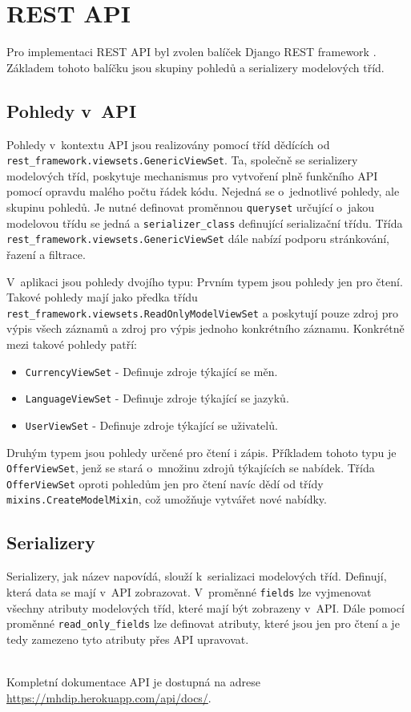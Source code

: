 \section{REST API}
Pro implementaci REST API byl zvolen balíček Django REST framework \cite{django-rest-framework}. Základem tohoto balíčku jsou skupiny pohledů a serializery modelových tříd.

\subsection{Pohledy v~API}
\begin{sloppypar}
Pohledy v~kontextu API jsou realizovány pomocí tříd dědících od \texttt{rest\_framework.viewsets.GenericViewSet}. Ta, společně se serializery modelových tříd, poskytuje mechanismus pro vytvoření plně funkčního API pomocí opravdu malého počtu řádek kódu. Nejedná se o~jednotlivé pohledy, ale skupinu pohledů. Je nutné definovat proměnnou \texttt{queryset} určující o~jakou modelovou třídu se jedná a \texttt{serializer\_class} definující serializační třídu. Třída \texttt{rest\_framework.viewsets.GenericViewSet} dále nabízí podporu stránkování, řazení a filtrace.

V~aplikaci jsou pohledy dvojího typu:
Prvním typem jsou pohledy jen pro čtení. Takové pohledy mají jako předka třídu \texttt{rest\_framework.viewsets.ReadOnlyModelViewSet} a poskytují pouze zdroj pro výpis všech záznamů a zdroj pro výpis jednoho konkrétního záznamu. Konkrétně mezi takové pohledy patří:
\begin{itemize}
    \item \texttt{CurrencyViewSet} - Definuje zdroje týkající se měn.
    \item \texttt{LanguageViewSet} - Definuje zdroje týkající se jazyků.
    \item \texttt{UserViewSet} - Definuje zdroje týkající se uživatelů.
\end{itemize}

Druhým typem jsou pohledy určené pro čtení i zápis. Příkladem tohoto typu je \texttt{OfferViewSet}, jenž se stará o~množinu zdrojů týkajících se nabídek. Třída \texttt{OfferViewSet} oproti pohledům jen pro čtení navíc dědí od třídy \texttt{mixins.CreateModelMixin}, což umožňuje vytvářet nové nabídky.
\end{sloppypar}

\subsection{Serializery}
Serializery, jak název napovídá, slouží k~serializaci modelových tříd. Definují, která data se mají v~API zobrazovat. V~proměnné \texttt{fields} lze vyjmenovat všechny atributy modelových tříd, které mají být zobrazeny v~API. Dále pomocí proměnné \texttt{read\_only\_fields} lze definovat atributy, které jsou jen pro čtení a je tedy zamezeno tyto atributy přes API upravovat.
\\\\

\begin{sloppypar}
Kompletní dokumentace API je dostupná na adrese \href{https://mhdip.herokuapp.com/api/docs/}{https://mhdip.herokuapp.com/api/docs/}.
\end{sloppypar}